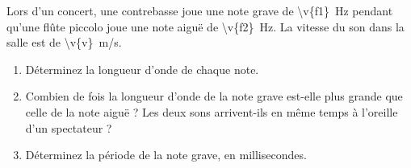 Lors d'un concert, une contrebasse joue une note grave de \qty{\v{f1}}{Hz} pendant qu'une flûte piccolo joue une note aiguë de \qty{\v{f2}}{Hz}. La vitesse du son dans la salle est de \qty{\v{v}}{m/s}.

\begin{enumerate}[label=\alph*)]
    \item Déterminez la longueur d'onde de chaque note.
    \item Combien de fois la longueur d'onde de la note grave est-elle plus grande que celle de la note aiguë ? Les deux sons arrivent-ils en même temps à l'oreille d'un spectateur ?
    \item Déterminez la période de la note grave, en millisecondes.
\end{enumerate}
